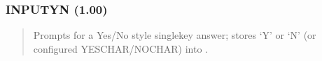 \documentclass[letterpaper,10pt,english]{sphinxmanual}
\begin{document}
\subsubsection{INPUTYN (1.00)}
\label{\detokenize{ppl:inputyn-1-00}}\begin{quote}

\sphinxAtStartPar
{}
\begin{description}
\sphinxAtStartPar
Prompts for a Yes/No style single\sphinxhyphen{}key answer; stores ‘Y’ or ‘N’ (or configured YESCHAR/NOCHAR) into .

\end{description}
\end{quote}
\end{document}
